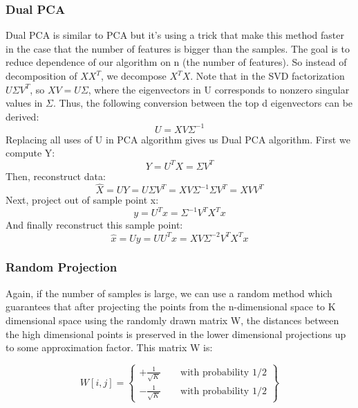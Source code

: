 \documentclass[a4paper]{article}
\begin{document}
\subsubsection{Dual PCA}
Dual PCA is similar to PCA but it's using a trick that make this method faster in the case that the number of features is bigger than the samples. The goal is to reduce dependence of our algorithm on n (the number of features). So instead of decomposition of $XX^T$, we decompose $X^TX$. Note that in the SVD factorization $U\Sigma V^T$, so $XV = U\Sigma$, where the eigenvectors in U corresponds to nonzero singular values in $\Sigma$. Thus, the following conversion between the top d eigenvectors can be derived:
\begin{equation}
U = XV\Sigma^{-1}
\end{equation}
Replacing all uses of U in PCA algorithm gives us Dual PCA algorithm. First we compute Y:
\begin{equation}
Y = U^TX = \Sigma V^T
\end{equation}
Then, reconstruct data:
\begin{equation}
\hat{X} = UY = U\Sigma V^T = XV\Sigma^{-1}\Sigma V^T = XVV^T
\end{equation}
Next, project out of sample point x:
\begin{equation}
y = U^T x = \Sigma^{-1} V^T X^T x 
\end{equation}
And finally reconstruct this sample point:
\begin{equation}
\hat{x} = U y = UU^T x = XV\Sigma^{-2} V^T X^T x 
\end{equation}

\subsubsection{Random Projection}
Again, if the number of samples is large, we can use a random method which guarantees that after projecting the points from the n-dimensional
space to K dimensional space using the randomly drawn matrix W, the distances between the high dimensional points is preserved in the lower dimensional projections up to some approximation factor. This matrix W is:

\[
W[i,j] = \left\{
				\begin{array}{ll}
				+\frac{1}{\sqrt{K}} \qquad \text{with probability 1/2}\\
                -\frac{1}{\sqrt{K}} \qquad \text{with probability 1/2}
				\end{array}
         \right \}
  \]      
\end{document}
